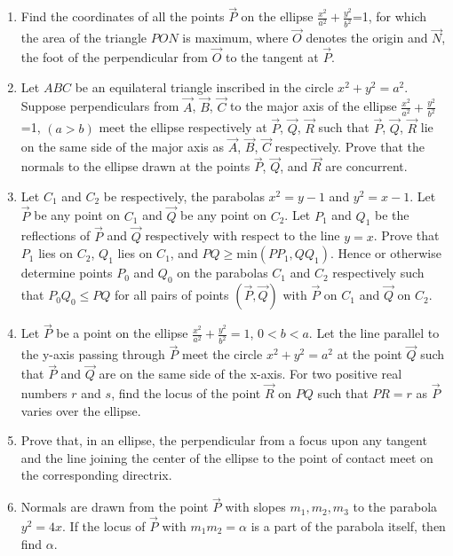 \begin{enumerate}
\item Find the coordinates of all the points $\vec{P}$ on the ellipse $\frac{x^2}{a^2}+\frac{y^2}{b^2}$=1, for which the area of the triangle $PON$ is maximum, where $\vec{O}$ denotes the origin and $\vec{N}$, the foot of the perpendicular from $\vec{O}$ to the tangent at $\vec{P}$. \hfill{}

\item Let $ABC$ be an equilateral triangle inscribed in the circle $x^2+y^2=a^2$. Suppose perpendiculars from $\vec{A}$, $\vec{B}$, $\vec{C}$ to the major axis of the ellipse $\frac{x^2}{a^2}+\frac{y^2}{b^2}$=1, $(a>b)$ meet the ellipse respectively at $\vec{P}$, $\vec{Q}$, $\vec{R}$ such that $\vec{P}$, $\vec{Q}$, $\vec{R}$ lie on the same side of the major axis as $\vec{A}$, $\vec{B}$, $\vec{C}$ respectively. Prove that the normals to the ellipse drawn at the points $\vec{P}$, $\vec{Q}$, and $\vec{R}$ are concurrent. \hfill{}

\item Let $C_1$ and $C_2$ be respectively, the parabolas $x^2=y-1$ and $y^2=x-1$. Let $\vec{P}$ be any point on $C_1$ and $\vec{Q}$ be any point on $C_2$. Let $P_1$ and $Q_1$ be the reflections of $\vec{P}$ and $\vec{Q}$ respectively with respect to the line $y=x$. Prove that $P_1$ lies on $C_2$, $Q_1$ lies on $C_1$, and $PQ \geq \text{min}({PP_1, QQ_1})$. Hence or otherwise determine points $P_0$ and $Q_0$ on the parabolas $C_1$ and $C_2$ respectively such that $P_0Q_0 \leq PQ$ for all pairs of points $(\vec{P},\vec{Q})$ with $\vec{P}$ on $C_1$ and $\vec{Q}$ on $C_2$. \hfill{}

\item Let $\vec{P}$ be a point on the ellipse $\frac{x^2}{a^2}+\frac{y^2}{b^2}=1$, $0<b<a$. Let the line parallel to the y-axis passing through $\vec{P}$ meet the circle $x^2+y^2=a^2$ at the point $\vec{Q}$ such that $\vec{P}$ and $\vec{Q}$ are on the same side of the x-axis. For two positive real numbers $r$ and $s$, find the locus of the point $\vec{R}$ on $PQ$ such that $PR
= r$ as $\vec{P}$ varies over the ellipse. \hfill{}

\item Prove that, in an ellipse, the perpendicular from a focus upon any tangent and the line joining the center of the ellipse to the point of contact meet on the corresponding directrix. \hfill{}

\item Normals are drawn from the point $\vec{P}$ with slopes $m_1, m_2, m_3$ to the parabola $y^2=4x$. If the locus of $\vec{P}$ with $m_1m_2=\alpha$ is a part of the parabola itself, then find $\alpha$. \hfill{}


\end{enumerate}
